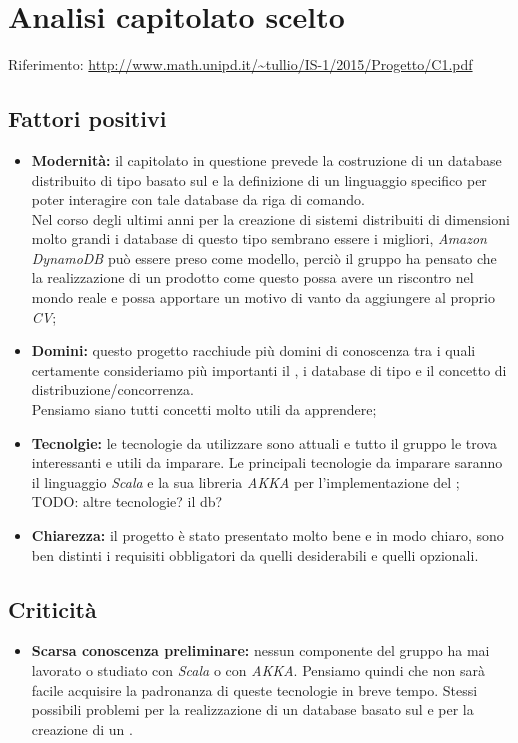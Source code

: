 \documentclass{scalatekids-article}
\begin{document}
\section{Analisi capitolato scelto}
Riferimento: \url{http://www.math.unipd.it/~tullio/IS-1/2015/Progetto/C1.pdf}\\
\subsection{Fattori positivi}
\begin{itemize}
  \item \textbf{Modernità:} il capitolato in questione prevede la costruzione di un database  distribuito di tipo  basato sul  e la definizione di un linguaggio specifico per poter interagire con tale database da riga di comando.\\
  Nel corso degli ultimi anni per la creazione di sistemi distribuiti di dimensioni molto grandi i database di questo tipo sembrano essere i migliori, \textit{Amazon DynamoDB} può essere preso come modello, perciò il gruppo ha pensato che la realizzazione di un prodotto come questo possa avere un riscontro nel mondo reale e possa apportare un motivo di vanto da aggiungere al proprio \textit{CV};
  \item \textbf{Domini:} questo progetto racchiude più domini di conoscenza tra i quali certamente consideriamo più importanti il , i database  di tipo  e il concetto di distribuzione/concorrenza. \\
  Pensiamo siano tutti concetti molto utili da apprendere;
  \item \textbf{Tecnolgie:} le tecnologie da utilizzare sono attuali e tutto il gruppo le trova interessanti e utili da imparare. Le principali tecnologie da imparare saranno il linguaggio \textit{Scala} e la sua libreria \textit{AKKA} per l'implementazione del ;
  \\TODO: altre tecnologie? il db?\\
  \item \textbf{Chiarezza:} il progetto è stato presentato molto bene e in modo chiaro, sono ben distinti i requisiti obbligatori da quelli desiderabili e quelli opzionali.
\end{itemize}
\subsection{Criticità}
\begin{itemize}
  \item \textbf{Scarsa conoscenza preliminare:} nessun componente del gruppo ha mai lavorato o studiato con \textit{Scala} o con \textit{AKKA}. Pensiamo quindi che non sarà facile acquisire la padronanza di queste tecnologie in breve tempo.
  Stessi possibili problemi per la realizzazione di un database basato sul  e per la creazione di un .
\end{itemize}
\end{document}

